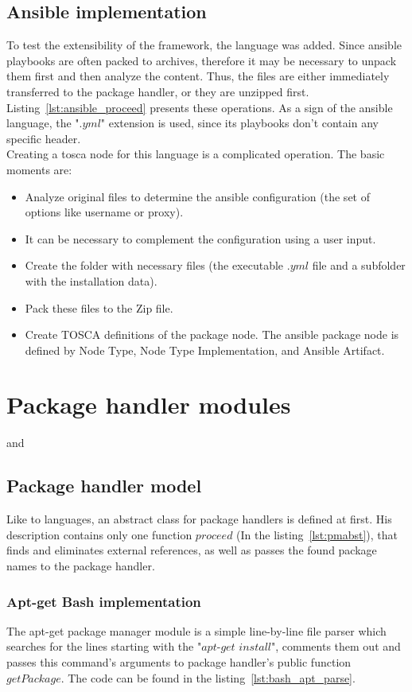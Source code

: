 \subsection*{Ansible implementation}
To test the extensibility of the framework, the  language was added.
Since ansible playbooks are often packed to archives, therefore it may be necessary to unpack them first and then analyze the content.
Thus, the files are either immediately transferred to the package handler, or they are unzipped first.
Listing~\ref{lst:ansible_proceed} presents these operations.
As a sign of the ansible language, the ".$yml$" extension is used, since its playbooks don't contain any specific header.\\
Creating a \gls{tosca} node for this language is a complicated operation. 
The basic moments are:
\begin{itemize}
	\item Analyze original files to determine the ansible configuration (the set of options like username or proxy).
	\item It can be necessary to complement the configuration using a user input.
	\item Create the folder with necessary files (the executable $.yml$ file and a subfolder with the installation data).
	\item Pack these files to the Zip file.
	\item Create TOSCA definitions of the package node. The ansible package node is defined by Node Type, Node Type Implementation, and Ansible Artifact.
\end{itemize} 


\section{Package handler modules}
 and 
\subsection*{Package handler model}
Like to languages, an abstract class for package handlers is defined at first.
His description contains only one function $proceed$ (In the listing~\ref{lst:pmabst}), that finds and eliminates external references, as well as passes the found package names to the package handler.
\subsubsection*{Apt-get Bash implementation}
The apt-get package manager module is a simple line-by-line file parser which searches for the lines starting with the "$apt$-$get$ $install$", comments them out and passes this command's arguments to package handler's public function $getPackage$. 
The code can be found in the listing~\ref{lst:bash_apt_parse}.
